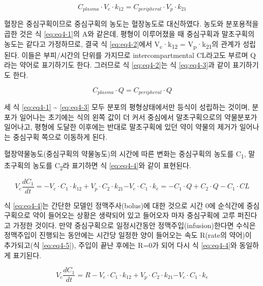 \documentclass[
  11pt,
  krantz2, a4paper, twoside]{krantz}
\theoremstyle{definition}
\theoremstyle{definition}
\theoremstyle{definition}
\theoremstyle{definition}
\theoremstyle{remark}
\begin{document}
\begin{equation}
C_{{plasma}} \cdot V_{c} \cdot k_{12} = C_{{peripheral}} \cdot V_{p} \cdot k_{21}
\label{eq:eq4-2}
\end{equation}

혈장은 중심구획이므로 중심구획의 농도는 혈장농도로 대신하였다. 농도와
분포용적을 곱한 것은 식 \eqref{eq:eq4-1}의 A와 같은데, 평형이 이루어졌을 때
중심구획과 말초구획의 농도는 같다고 가정하므로, 결국 식 \eqref{eq:eq4-2}에서
V\textsubscript{c}·k\textsubscript{12} = V\textsubscript{p}·k\textsubscript{21}의 관계가 성립된다. 이들은 부피/시간의 단위를
가지므로 intercompartmental CL라고도 부르며 Q라는 약어로
표기하기도 한다. 그러므로 식 \eqref{eq:eq4-2}는 식 \eqref{eq:eq4-3}과 같이 표기하기도 한다.

\begin{equation}
C_{{plasma}} \cdot Q = C_{{peripheral}} \cdot Q
\label{eq:eq4-3}
\end{equation}

세 식 \eqref{eq:eq4-1} \textasciitilde{} \eqref{eq:eq4-3} 모두 분포의 평형상태에서만 등식이 성립하는 것이며, 분포가 일어나는 초기에는 식의 왼쪽 값이 더 커서 중심에서 말초구획으로의 약물분포가 일어나고, 평형에 도달한 이후에는 반대로 말초구획에 있던 약이 약물의 제거가 일어나는 중심구획 쪽으로 이동하게 된다.

혈장약물농도(중심구획의 약물농도)의 시간에 따른 변화는 중심구획의 농도를 C\textsubscript{1}, 말초구획의 농도를 C\textsubscript{2}라 표기하면 식 \eqref{eq:eq4-4}와 같이 표현된다.

\begin{equation}
V_{c}\frac{{dC}_{1}}{{dt}} = {- V}_{c} \cdot C_{1} \cdot k_{12} + V_{p} \cdot C_{2} \cdot k_{21}{- V}_{c} \cdot C_{1} \cdot k_{e} 
= - C_{1} \cdot Q + C_{2} \cdot Q - C_{1} \cdot {CL}
\label{eq:eq4-4}
\end{equation}

식 \eqref{eq:eq4-4}는 간단한 모델인 정맥주사(bolus)에 대한 것으로 시간 0에 순식간에 중심구획으로 약이 들어오는 상황은 생략되어 있고 들어오자 마자 중심구획에 고루 퍼진다고 가정한 것이다.
만약 중심구획으로 일정시간동안 정맥주입(infusion)한다면 수식은 정맥주입이 진행되는 동안에는 시간당 일정한 양이 들어오는 속도 R(rate의 약어)이 추가되고(식 \eqref{eq:eq4-5}), 주입이 끝난 후에는 R=0가 되어 다시 식 \eqref{eq:eq4-4}와 동일하게 표기된다.

\begin{equation}
V_{c}\frac{{dC}_{1}}{{dt}} = {R - V}_{c} \cdot C_{1} \cdot k_{12} + V_{p} \cdot C_{2} \cdot k_{21}{- V}_{c} \cdot C_{1} \cdot k_{e}
\label{eq:eq4-5}
\end{equation}
\end{document}
